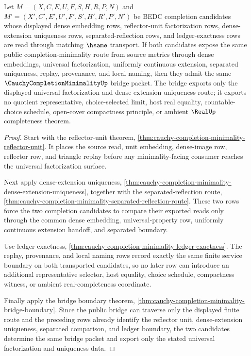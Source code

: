 \begin{theorem}
\label{thm:cauchy-completion-minimality-bridge-exactness}
Let $M=(X,C,E,U,F,S,H,R,P,N)$ and $M'=(X',C',E',U',F',S',H',R',P',N')$ be BEDC completion candidates whose displayed dense embedding rows, reflector-unit factorization rows, dense-extension uniqueness rows, separated-reflection rows, and ledger-exactness rows are read through matching $\hsame$ transport. If both candidates expose the same public completion-minimality route from source metrics through dense embeddings, universal factorization, uniformly continuous extension, separated uniqueness, replay, provenance, and local naming, then they admit the same $\CauchyCompletionMinimalityUp$ bridge packet. The bridge exports only the displayed universal factorization and dense-extension uniqueness route; it exports no quotient representative, choice-selected limit, host real equality, countable-choice schedule, open-cover compactness principle, or ambient $\RealUp$ completeness theorem.
\end{theorem}
\begin{proof}
Start with the reflector-unit theorem, \autoref{thm:cauchy-completion-minimality-reflector-unit}. It places the source read, unit embedding, dense-image row, reflector row, and triangle replay before any minimality-facing consumer reaches the universal factorization surface.

Next apply dense-extension uniqueness, \autoref{thm:cauchy-completion-minimality-dense-extension-uniqueness}, together with the separated-reflection route, \autoref{thm:cauchy-completion-minimality-separated-reflection-route}. These two rows force the two completion candidates to compare their exported reads only through the common dense embedding, universal-property row, uniformly continuous extension handoff, and separated boundary.

Use ledger exactness, \autoref{thm:cauchy-completion-minimality-ledger-exactness}. The replay, provenance, and local naming rows record exactly the same finite service boundary on both transported candidates, so no later row can introduce an additional representative selector, host equality, choice schedule, compactness witness, or ambient real-completeness coordinate.

Finally apply the bridge boundary theorem, \autoref{thm:cauchy-completion-minimality-bridge-boundary}. Since the public bridge can traverse only the displayed finite route and the preceding rows already identify the reflector unit, dense-extension uniqueness, separated comparison, and ledger boundary, the two candidates determine the same bridge packet and export only the stated universal factorization and uniqueness data.
\end{proof}

